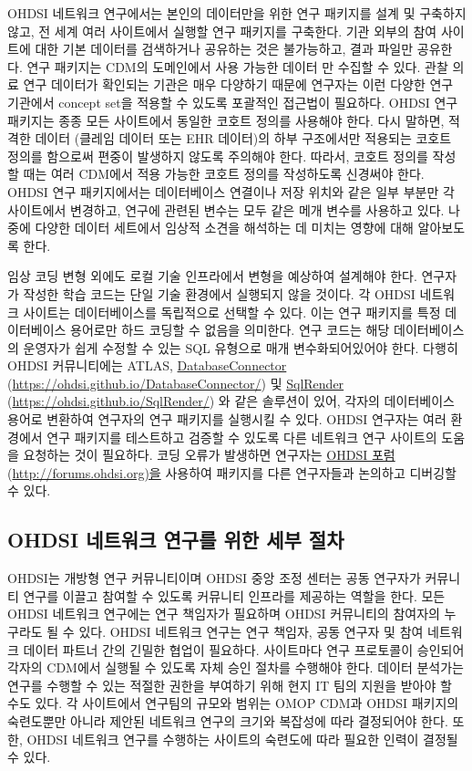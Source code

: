 \documentclass[11pt]{book}
\theoremstyle{definition}
\theoremstyle{definition}
\theoremstyle{definition}
\theoremstyle{remark}
\begin{document}
OHDSI 네트워크 연구에서는 본인의 데이터만을 위한 연구 패키지를 설계 및
구축하지 않고, 전 세계 여러 사이트에서 실행할 연구 패키지를 구축한다.
기관 외부의 참여 사이트에 대한 기본 데이터를 검색하거나 공유하는 것은
불가능하고, 결과 파일만 공유한다. 연구 패키지는 CDM의 도메인에서 사용
가능한 데이터 만 수집할 수 있다. 관찰 의료 연구 데이터가 확인되는 기관은
매우 다양하기 때문에 연구자는 이런 다양한 연구 기관에서 concept set을
적용할 수 있도록 포괄적인 접근법이 필요하다. OHDSI 연구 패키지는 종종
모든 사이트에서 동일한 코호트 정의를 사용해야 한다. 다시 말하면, 적격한
데이터 (클레임 데이터 또는 EHR 데이터)의 하부 구조에서만 적용되는 코호트
정의를 함으로써 편중이 발생하지 않도록 주의해야 한다. 따라서, 코호트
정의를 작성할 때는 여러 CDM에서 적용 가능한 코호트 정의를 작성하도록
신경써야 한다. OHDSI 연구 패키지에서는 데이터베이스 연결이나 저장 위치와
같은 일부 부분만 각 사이트에서 변경하고, 연구에 관련된 변수는 모두 같은
메개 변수를 사용하고 있다. 나중에 다양한 데이터 세트에서 임상적 소견을
해석하는 데 미치는 영향에 대해 알아보도록 한다.

임상 코딩 변형 외에도 로컬 기술 인프라에서 변형을 예상하여 설계해야
한다. 연구자가 작성한 학습 코드는 단일 기술 환경에서 실행되지 않을
것이다. 각 OHDSI 네트워크 사이트는 데이터베이스를 독립적으로 선택할 수
있다. 이는 연구 패키지를 특정 데이터베이스 용어로만 하드 코딩할 수
없음을 의미한다. 연구 코드는 해당 데이터베이스의 운영자가 쉽게 수정할 수
있는 SQL 유형으로 매개 변수화되어있어야 한다. 다행히 OHDSI 커뮤니티에는
ATLAS, \protect\hyperlink{DatabaseConnector}{DatabaseConnector}
(\url{https://ohdsi.github.io/DatabaseConnector/}) 및
\protect\hyperlink{SqlRender}{SqlRender}
(\url{https://ohdsi.github.io/SqlRender/}) 와 같은 솔루션이 있어, 각자의
데이터베이스 용어로 변환하여 연구자의 연구 패키지를 실행시킬 수 있다.
OHDSI 연구자는 여러 환경에서 연구 패키지를 테스트하고 검증할 수 있도록
다른 네트워크 연구 사이트의 도움을 요청하는 것이 필요하다. 코딩 오류가
발생하면 연구자는 \protect\hyperlink{ohdsi-}{OHDSI 포럼}
(\url{http://forums.ohdsi.org)을} 사용하여 패키지를 다른 연구자들과
논의하고 디버깅할 수 있다.

\subsection{OHDSI 네트워크 연구를 위한 세부 절차}\label{ohdsi-----}


OHDSI는 개방형 연구 커뮤니티이며 OHDSI 중앙 조정 센터는 공동 연구자가
커뮤니티 연구를 이끌고 참여할 수 있도록 커뮤니티 인프라를 제공하는
역할을 한다. 모든 OHDSI 네트워크 연구에는 연구 책임자가 필요하며 OHDSI
커뮤니티의 참여자의 누구라도 될 수 있다. OHDSI 네트워크 연구는 연구
책임자, 공동 연구자 및 참여 네트워크 데이터 파트너 간의 긴밀한 협업이
필요하다. 사이트마다 연구 프로토콜이 승인되어 각자의 CDM에서 실행될 수
있도록 자체 승인 절차를 수행해야 한다. 데이터 분석가는 연구를 수행할 수
있는 적절한 권한을 부여하기 위해 현지 IT 팀의 지원을 받아야 할 수도
있다. 각 사이트에서 연구팀의 규모와 범위는 OMOP CDM과 OHDSI 패키지의
숙련도뿐만 아니라 제안된 네트워크 연구의 크기와 복잡성에 따라 결정되어야
한다. 또한, OHDSI 네트워크 연구를 수행하는 사이트의 숙련도에 따라 필요한
인력이 결정될 수 있다.
\end{document}
